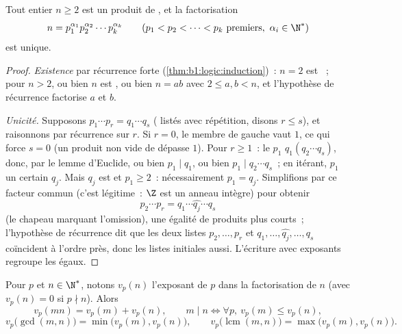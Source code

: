 \begin{theorem}\label{thm:b1:arith:fta}
Tout entier $n \geq 2$ est un produit de , et la
factorisation
\[
n = p_1^{\alpha_1} p_2^{\alpha_2} \cdots p_k^{\alpha_k}
\qquad (p_1 < p_2 < \dots < p_k \text{ premiers},\ \alpha_i \in \N^*)
\]
est unique.
\end{theorem}

\begin{proof}
\emph{Existence} par récurrence forte (\cref{thm:b1:logic:induction})~:
$n = 2$ est ~; pour $n > 2$, ou bien $n$ est , ou bien $n = ab$ avec
$2 \leq a, b < n$, et l'hypothèse de récurrence factorise $a$ et $b$.

\emph{Unicité.} Supposons $p_1 \cdots p_r = q_1 \cdots q_s$
( listés avec répétition, disons $r \leq s$), et raisonnons par
récurrence sur $r$. Si $r = 0$, le membre de gauche vaut $1$, ce qui force $s = 0$ (un produit
non vide de  dépasse $1$). Pour $r \geq 1$~: le  $p_1$
 $q_1(q_2\cdots q_s)$, donc, par le lemme d'Euclide, ou bien $p_1
\mid q_1$, ou bien $p_1 \mid q_2\cdots q_s$~; en itérant, $p_1$ 
un certain $q_j$. Mais $q_j$ est  et $p_1 \geq 2$~: nécessairement $p_1
= q_j$. Simplifions par ce facteur commun (c'est légitime~: $\Z$ est un
anneau intègre) pour obtenir
\[
p_2 \cdots p_r = q_1 \cdots \widehat{q_j} \cdots q_s
\]
(le chapeau marquant l'omission), une égalité de produits plus courts~;
l'hypothèse de récurrence dit que les deux listes $p_2, \dots, p_r$ et
$q_1, \dots, \widehat{q_j}, \dots, q_s$ coïncident à l'ordre près,
donc les listes initiales aussi. L'écriture avec exposants regroupe les
 égaux.
\end{proof}

\begin{proposition}[Valuations]\label{prop:b1:arith:valuation}
Pour $p$  et $n \in \N^*$, notons $v_p(n)$ l'exposant de $p$ dans la
factorisation de $n$ (avec $v_p(n) = 0$ si $p \nmid n$). Alors
\[
v_p(mn) = v_p(m) + v_p(n),
\qquad
m \mid n \iff \forall p,\ v_p(m) \leq v_p(n),
\]
\[
v_p\bigl(\gcd(m,n)\bigr) = \min\bigl(v_p(m), v_p(n)\bigr),
\qquad
v_p\bigl(\operatorname{lcm}(m,n)\bigr) = \max\bigl(v_p(m),
v_p(n)\bigr).
\]
\end{proposition}

